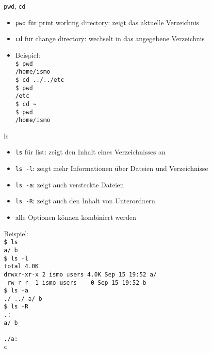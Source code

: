 \documentclass[t]{beamer}
\begin{document}
      \begin{frame}{\texttt{pwd}, \texttt{cd}}
        \begin{itemize}
          \item \texttt{pwd} für print working directory: zeigt das aktuelle Verzeichnis
          \item \texttt{cd} für change directory: wechselt in das angegebene Verzeichnis
          \item Beispiel:\\
            \texttt{\$ pwd\\
                    /home/ismo\\
                    \$ cd ../../etc\\
                    \$ pwd\\
                    /etc\\
                    \$ cd \textasciitilde\\
                    \$ pwd\\
                    /home/ismo}
        \end{itemize}
      \end{frame}

      \begin{frame}{ls}
        \begin{itemize}
          \item \texttt{ls} für list: zeigt den Inhalt eines Verzeichnisses an
          \item \texttt{ls -l}: zeigt mehr Informationen über Dateien und Verzeichnisse
          \item \texttt{ls -a}: zeigt auch versteckte Dateien
          \item \texttt{ls -R}: zeigt auch den Inhalt von Unterordnern
          \item alle Optionen können kombiniert werden
        \end{itemize}
      \end{frame}

      \begin{frame}
        Beispiel:\\
        \texttt{\$ ls\\
                a/  b\\
                \$ ls -l\\
                total 4.0K\\
                drwxr-xr-x 2 ismo users 4.0K Sep 15 19:52 a/\\
                -rw-r--r-- 1 ismo users \ \ \ 0 Sep 15 19:52 b\\
                \$ ls -a\\
                ./  ../  a/  b\\
                \$ ls -R\\
                .:\\
                a/  b\\
                ~\\
                ./a:\\
                c}
      \end{frame}
\end{document}
